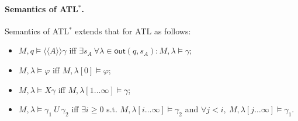 \paragraph{Semantics of ATL$^*$.}
Semantics of ATL$^*$ extends that for ATL as follows: 
\begin{itemize}
  \item[-] $M,q \models \langle\!\langle A\rangle\!\rangle \gamma$ iff
        $\exists s_A \ \forall \lambda \in \mathsf{out}(q,s_A):
        M,\lambda \models \gamma$;
  \item[-] $M,\lambda \models \varphi$ iff $M,\lambda[0] \models \varphi$;
  \item[-] $M,\lambda \models X\gamma$ iff
        $M,\lambda[1 \dots \infty] \models \gamma$;
  \item[-] $M,\lambda \models \gamma_1 \ U \ \gamma_2$ iff
        $\exists i \ge 0$ s.t.
        $M,\lambda[i \dots \infty] \models \gamma_2$ and
        $\forall j < i,\ M,\lambda[j \dots \infty] \models \gamma_1$.
\end{itemize}




